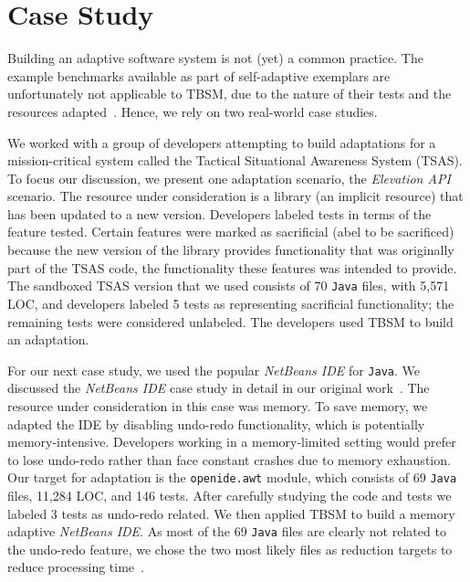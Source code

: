 \section{Case Study}
Building an adaptive software system is not (yet) a common practice. The example benchmarks available as part of self-adaptive exemplars are unfortunately not applicable to TBSM, due to the nature of their tests and the resources adapted~\cite{exemplars}. Hence, we rely on two real-world case studies.   

We worked with a group of developers attempting to build adaptations for a mission-critical system called the Tactical Situational Awareness System (TSAS). To focus our discussion, we present one adaptation scenario, the \textit{Elevation API} scenario. The resource under consideration is a library (an implicit resource) that has been updated to a new version. Developers labeled tests in terms of the feature tested. Certain features were marked as sacrificial (abel to be sacrificed) because the new version of the library provides functionality that was originally part of the TSAS code, the functionality these features was intended to provide. The sandboxed TSAS version that we used consists of 70 \texttt{Java} files, with 5,571 LOC, and developers labeled 5 tests as representing sacrificial functionality; the remaining tests were considered unlabeled. The developers used TBSM to build an adaptation.

For our next case study, we used the popular \textit{NetBeans IDE} for \texttt{Java}. We discussed the \textit{NetBeans IDE} case study in detail in our original work~\cite{christi2017saso}. The resource under consideration in this case was memory. To save memory, we adapted the IDE by disabling undo-redo functionality, which is potentially memory-intensive. Developers working in a memory-limited setting would prefer to lose undo-redo rather than face constant crashes due to memory exhaustion. Our target for adaptation is the \texttt{openide.awt} module, which consists of 69 \texttt{Java} files, 11,284 LOC, and 146 tests. After carefully studying the code and tests we labeled 3 tests as undo-redo related. We then applied TBSM to build a memory adaptive \textit{NetBeans IDE}. As most of the 69 \texttt{Java} files are clearly not related to the undo-redo feature, we chose the two most likely files as reduction targets to reduce processing time~\cite{christi2017saso}. 
